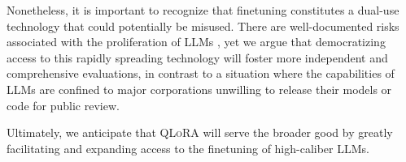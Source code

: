 Nonetheless, it is important to recognize that finetuning constitutes a dual-use technology that could potentially be misused. There are well-documented risks associated with the proliferation of LLMs \citep{bommasani2021opportunities,bender2021dangers}, yet we argue that democratizing access to this rapidly spreading technology will foster more independent and comprehensive evaluations, in contrast to a situation where the capabilities of LLMs are confined to major corporations unwilling to release their models or code for public review.

Ultimately, we anticipate that \textsc{QLoRA} will serve the broader good by greatly facilitating and expanding access to the finetuning of high-caliber LLMs.